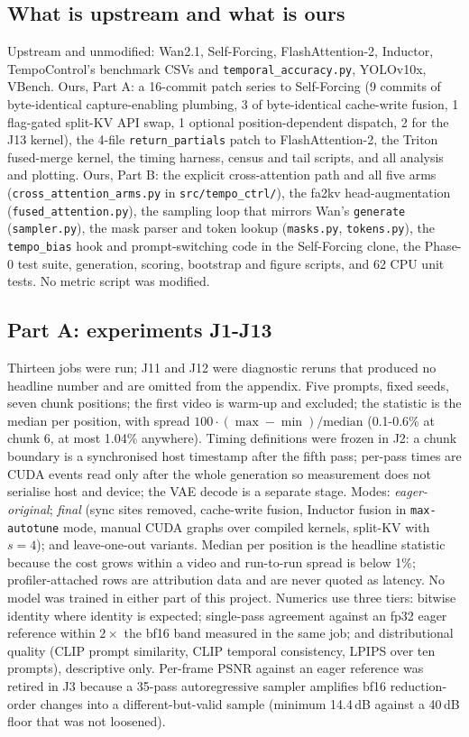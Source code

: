 \documentclass[10pt,a4paper]{article}
\begin{document}
\subsection{What is upstream and what is ours}
Upstream and unmodified: Wan2.1, Self-Forcing, FlashAttention-2, Inductor, TempoControl's benchmark CSVs and \texttt{temporal\_accuracy.py}, YOLOv10x, VBench. Ours, Part A: a 16-commit patch series to Self-Forcing (9 commits of byte-identical capture-enabling plumbing, 3 of byte-identical cache-write fusion, 1 flag-gated split-KV API swap, 1 optional position-dependent dispatch, 2 for the J13 kernel), the 4-file \texttt{return\_partials} patch to FlashAttention-2, the Triton fused-merge kernel, the timing harness, census and tail scripts, and all analysis and plotting. Ours, Part B: the explicit cross-attention path and all five arms (\texttt{cross\_attention\_arms.py} in \texttt{src/tempo\_ctrl/}), the fa2kv head-augmentation (\texttt{fused\_attention.py}), the sampling loop that mirrors Wan's \texttt{generate} (\texttt{sampler.py}), the mask parser and token lookup (\texttt{masks.py}, \texttt{tokens.py}), the \texttt{tempo\_bias} hook and prompt-switching code in the Self-Forcing clone, the Phase-0 test suite, generation, scoring, bootstrap and figure scripts, and 62 CPU unit tests. No metric script was modified.

\subsection{Part A: experiments J1-J13}
Thirteen jobs were run; J11 and J12 were diagnostic reruns that produced no headline number and are omitted from the appendix.
Five prompts, fixed seeds, seven chunk positions; the first video is warm-up and excluded; the statistic is the median per position, with spread $100\cdot(\max-\min)/\text{median}$ (0.1-0.6\% at chunk 6, at most 1.04\% anywhere). Timing definitions were frozen in J2: a chunk boundary is a synchronised host timestamp after the fifth pass; per-pass times are CUDA events read only after the whole generation so measurement does not serialise host and device; the VAE decode is a separate stage. Modes: \emph{eager-original}; \emph{final} (sync sites removed, cache-write fusion, Inductor fusion in \texttt{max-autotune} mode, manual CUDA graphs over compiled kernels, split-KV with $s=4$); and leave-one-out variants. Median per position is the headline statistic because the cost grows within a video and run-to-run spread is below 1\%; profiler-attached rows are attribution data and are never quoted as latency. No model was trained in either part of this project. Numerics use three tiers: bitwise identity where identity is expected; single-pass agreement against an fp32 eager reference within $2\times$ the bf16 band measured in the same job; and distributional quality (CLIP prompt similarity, CLIP temporal consistency, LPIPS over ten prompts), descriptive only. Per-frame PSNR against an eager reference was retired in J3 because a 35-pass autoregressive sampler amplifies bf16 reduction-order changes into a different-but-valid sample (minimum 14.4\,dB against a 40\,dB floor that was not loosened).
\end{document}
